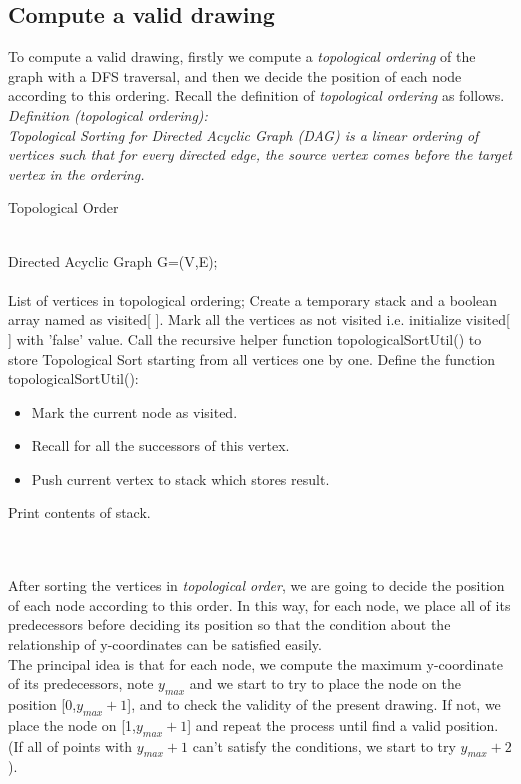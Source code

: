 \documentclass[utf8, a4paper, 12pt]{article}
\begin{document}
\subsection{Compute a valid drawing}
\indent To compute a valid drawing, firstly we compute a \textit{topological ordering} of the graph with a DFS traversal, and then we decide the position of each node according to this ordering. Recall the definition of \textit{topological ordering} as follows.\\
\textit{Definition (topological ordering):\\
Topological Sorting for Directed Acyclic Graph (DAG) is a linear ordering of vertices such that for every directed edge, the source vertex comes before the target vertex in the ordering.}
\begin{algorithm}
\begin{algorithmic}[1]
\caption{Topological Order}
\REQUIRE ~~\\ 
Directed Acyclic Graph G=(V,E);\\
\ENSURE ~~\\ 
List of vertices in topological ordering;
\STATE  Create a temporary stack and a boolean array named as visited[ ].
\STATE  Mark all the vertices as not visited i.e. initialize visited[ ] with 'false' value.
\STATE  Call the recursive helper function topologicalSortUtil() to store Topological Sort starting from all vertices one by one.
\STATE Define the function topologicalSortUtil():
\begin{itemize}
\item Mark the current node as visited.
\item Recall for all the successors of this vertex.
\item Push current vertex to stack which stores result.
\end{itemize}
\STATE Print contents of stack.
 \end{algorithmic}
\end{algorithm}\\
~\\
\indent After sorting the vertices in \textit{topological order}, we are going to decide the position of each node according to this order. In this way, for each node, we place all of its predecessors before deciding its position so that the condition about the relationship of y-coordinates can be satisfied easily. \\
\indent The principal idea is that for each node, we compute the maximum y-coordinate of its predecessors, note $y_{max}$ and we start to try to place the node on the position [0,$y_{max}+1$], and to check the validity of the present drawing. If not, we place the node on [1,$y_{max}+1$] and repeat the process until find a valid position. (If all of points with $y_{max}+1$ can't satisfy the conditions, we start to try $y_{max}+2$ ). \\
\end{document}
